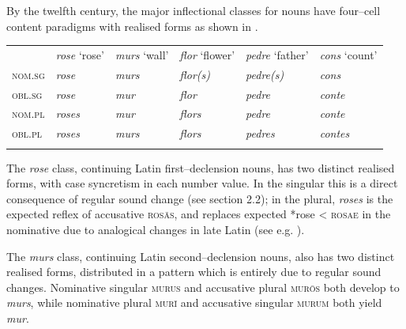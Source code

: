 \documentclass[output=paper]{langscibook}
\begin{document}
By the twelfth century, the major inflectional classes for nouns have four–cell content paradigms with realised forms as shown in . 


\begin{tabularx}{\textwidth}{XXXXXX}
 & \textit{rose} ‘rose’ & \textit{murs} ‘wall’ & \textit{flor} ‘flower’ & \textit{pedre} ‘father’ & \textit{cons} ‘count’\\
\lsptoprule
\textsc{nom.sg} & \textit{rose} & \textit{murs}  & \textit{flor(s)} & \textit{pedre(s)} & \textit{cons}\\
\textsc{obl.sg} & \textit{rose} & \textit{mur} & \textit{flor} & \textit{pedre} & \textit{conte}\\
\textsc{nom.pl} & \textit{roses} & \textit{mur} & \textit{flors} & \textit{pedre} & \textit{conte}\\
\textsc{obl.pl} & \textit{roses} & \textit{murs} & \textit{flors} & \textit{pedres} & \textit{contes}\\
\lspbottomrule
\end{tabularx}
\begin{stylelsTableHeading}%
\begin{table}
\caption{Singular and plural forms of first–declension \textit{rose} ‘rose’, second–declension \textit{murs} ‘wall’, third–declension \textit{flor} ‘flower’, \textit{pedre} ‘father’ and \textit{cons} ‘count’ in twelfth–century French.}
\label{tab:key:4}
\end{table}\end{stylelsTableHeading}

The \textit{rose} class, continuing Latin first–declension nouns, has two distinct realised forms, with case syncretism in each number value. In the singular this is a direct consequence of regular sound change (see section 2.2); in the plural, \textit{roses} is the expected reflex of accusative \textsc{rosās}, and replaces expected *rose < \textsc{rosae} in the nominative due to analogical changes in late Latin (see e.g. \citealt{Schøsler2013}). 

The \textit{murs} class, continuing Latin second–declension nouns, also has two distinct realised forms, distributed in a pattern which is entirely due to regular sound changes. Nominative singular \textsc{murus} and accusative plural \textsc{murōs} both develop to \textit{murs}, while nominative plural \textsc{murī} and accusative singular \textsc{murum} both yield \textit{mur}. 
\end{document}
